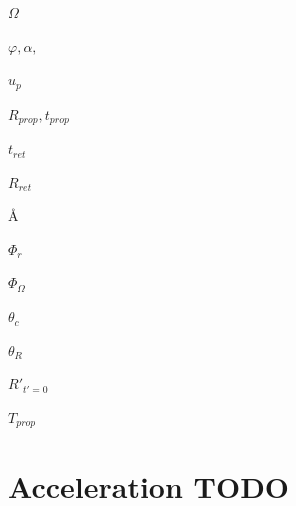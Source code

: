 $\Omega$ \newline

$\varphi, \alpha,$  \newline

$u_p$ \newline

$R_{prop}, t_{prop}$ \newline

$t_{ret}$ \newline

$R_{ret}$ \newline

\AA  \newline

$\Phi_r$ \newline

$\Phi_{\Omega}$ \newline

$\theta_c$ \newline

$\theta_R$ \newline

$R'_{t'=0}$ \newline

$T_{prop}$ \newline

\chapter{Acceleration TODO}

